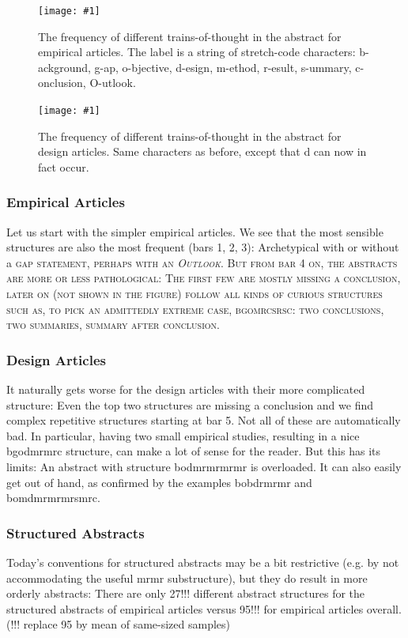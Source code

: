\documentclass[10pt,journal,compsoc]{IEEEtran}
\newcommand{\Plot}[2]{%
	\begin{figure}[htb]%
		\centering\texttt{[image: \#1]}%
		\vspace{-4mm}\caption{#2}\label{#1}%
	\end{figure}}
\newcommand{\Cb}[1]{\bgroup\scshape #1\egroup}  %
\begin{document}
\Plot{ab_topicstructure_freqs_empir}{%
  The frequency of different trains-of-thought in the abstract for empirical articles.
  The label is a string of stretch-code characters:
  b-ackground, g-ap, o-bjective, d-esign, m-ethod, r-esult, s-ummary, c-onclusion, O-utlook.}
\Plot{ab_topicstructure_freqs_design}{%
  The frequency of different trains-of-thought in the abstract for design articles.
  Same characters as before, except that d can now in fact occur.}

\subsubsection{Empirical Articles}

Let us start with the simpler empirical articles.
We see that the most sensible structures are also the most frequent (bars 1, 2, 3):
Archetypical with or without a \Cb{gap} statement, perhaps with an \emph{Outlook}.
But from bar 4 on, the abstracts are more or less pathological:
The first few are mostly missing a conclusion, later on (not shown in the figure)
follow all kinds of curious structures such as, to pick an admittedly extreme case,
bgomrcsrsc: two conclusions, two summaries, summary after conclusion.

\subsubsection{Design Articles}

It naturally gets worse for the design articles with their more complicated structure:
Even the top two structures are missing a conclusion
and we find complex repetitive structures starting at bar 5.
Not all of these are automatically bad.
In particular, having two small empirical studies, resulting in a nice bgodmrmrc structure,
can make a lot of sense for the reader.
But this has its limits: An abstract with structure bodmrmrmrmr is overloaded.
It can also easily get out of hand, as confirmed by the examples bobdrmrmr and bomdmrmrmrsmrc.

\subsubsection{Structured Abstracts}

Today's conventions for structured abstracts may be a bit restrictive
(e.g. by not accommodating the useful mrmr substructure),
but they do result in more orderly abstracts:
There are only 27!!! different abstract structures for the structured abstracts of empirical articles
versus 95!!! for empirical articles overall.
(!!! replace 95 by mean of same-sized samples)
\end{document}
